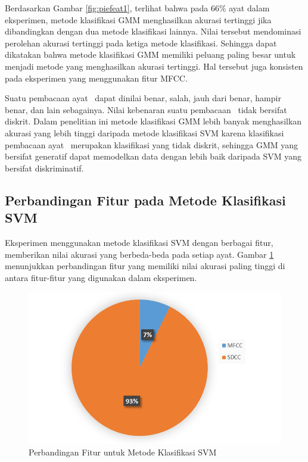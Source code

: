   Berdasarkan Gambar \ref{fig:piefeat1}, terlihat bahwa pada 66\% ayat dalam eksperimen, metode klasifikasi GMM menghasilkan akurasi tertinggi jika dibandingkan dengan dua metode klasifikasi lainnya. Nilai tersebut mendominasi perolehan akurasi tertinggi pada ketiga metode klasifikasi. Sehingga dapat dikatakan bahwa metode klasifikasi GMM memiliki peluang paling besar untuk menjadi metode yang menghasilkan akurasi tertinggi. Hal tersebut juga konsisten pada eksperimen yang menggunakan fitur MFCC.

  Suatu pembacaan ayat \quran~dapat dinilai benar, salah, jauh dari benar, hampir benar, dan lain sebagainya. Nilai kebenaran suatu pembacaan \quran~tidak bersifat diskrit. Dalam penelitian ini metode klasifikasi GMM lebih banyak menghasilkan akurasi yang lebih tinggi daripada metode klasifikasi SVM karena klasifikasi pembacaan ayat \quran~merupakan klasifikasi yang tidak diskrit, sehingga GMM yang bersifat generatif dapat memodelkan data dengan lebih baik daripada SVM yang bersifat diskriminatif.










  \subsection{Perbandingan Fitur pada Metode Klasifikasi SVM}
  Eksperimen menggunakan metode klasifikasi SVM dengan berbagai fitur, memberikan nilai akurasi yang berbeda-beda pada setiap ayat. Gambar \ref{fig:pieclass0} menunjukkan perbandingan fitur yang memiliki nilai akurasi paling tinggi di antara fitur-fitur yang digunakan dalam eksperimen.

  \begin{figure}
    \centering
    \includegraphics[width=0.9\linewidth]{pics/pieclass0}
    \caption{Perbandingan Fitur untuk Metode Klasifikasi SVM}
    \label{fig:pieclass0}
  \end{figure}

